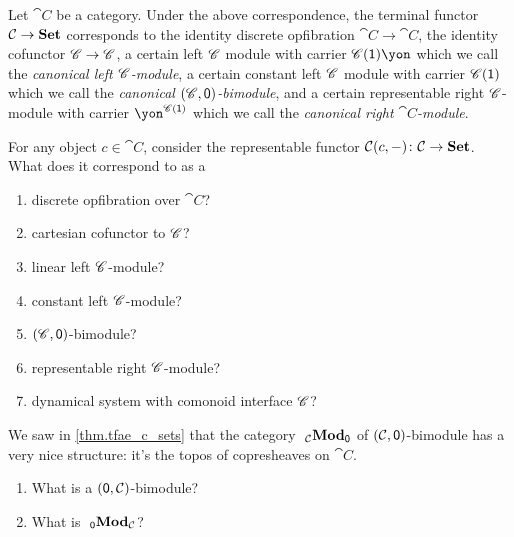 \documentclass[DynamicalBook]{subfiles}
\begin{document}
Let $\cat{C}$ be a category. Under the above correspondence, the terminal functor $\mathcal{C}\to\textbf{Set}$ corresponds to the identity discrete opfibration $\cat{C}\to\cat{C}$, the identity cofunctor $\mathscr{C}\to\mathscr{C}$, a certain left $\mathscr{C}$ module with carrier $\com{C}(\1)\yon$ which we call the \emph{canonical left $\mathscr{C}$-module}, a certain constant left $\mathscr{C}$ module with carrier $\mathscr{C}(\textsf{1})$ which we call the \emph{canonical $(\mathscr{C},\textsf{0})$-bimodule}, and a certain representable right $\mathscr{C}$-module with carrier $\yon^{\com{C}(\1)}$ which we call the \emph{canonical right $\cat{C}$-module}.

\begin{exercise}
For any object $c\in \cat{C}$, consider the representable functor $\mathcal{C}(c,-)\colon\mathcal{C}\to\textbf{Set}$. What does it correspond to as a
\begin{enumerate}
	\item discrete opfibration over $\cat{C}$?
	\item cartesian cofunctor to $\mathscr{C}$?
	\item linear left $\mathscr{C}$-module?
	\item constant left $\mathscr{C}$-module?
	\item $(\mathscr{C},\textsf{0})$-bimodule?
	\item representable right $\mathscr{C}$-module?
	\item dynamical system with comonoid interface $\mathscr{C}$?
\qedhere
\end{enumerate}
\end{exercise}

\begin{exercise}
We saw in \cref{thm.tfae_c_sets} that the category $~_{\mathcal{C}}\textbf{Mod}_{\textsf{0}}$ of $(\mathcal{C},\textsf{0})$-bimodule has a very nice structure: it's the topos of copresheaves on $\cat{C}$. 
\begin{enumerate}
	\item What is a $(\textsf{0},\mathcal{C})$-bimodule?
	\item What is $~_{\textsf{0}}\textbf{Mod}_{\mathcal{C}}$?
\qedhere
\end{enumerate}
\end{exercise}
\end{document}
